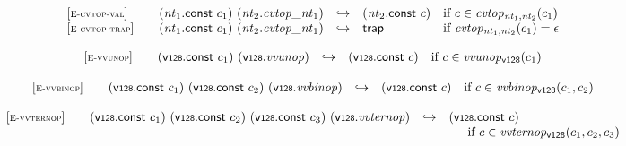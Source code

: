 \vspace{1ex}

$$
\begin{array}[t]{@{}lrcl@{}l@{}}
{[\textsc{\scriptsize E{-}cvtop{-}val}]} \quad & ({\mathit{nt}}_1{.}\mathsf{const}~c_1)~({\mathit{nt}}_2 {.} {{\mathit{cvtop}}}{\mathsf{\_}}{{\mathit{nt}}_1}) & \hookrightarrow & ({\mathit{nt}}_2{.}\mathsf{const}~c) & \quad \mbox{if}~ c \in {{\mathit{cvtop}}}{{}_{{\mathit{nt}}_1, {\mathit{nt}}_2}(c_1)} \\
{[\textsc{\scriptsize E{-}cvtop{-}trap}]} \quad & ({\mathit{nt}}_1{.}\mathsf{const}~c_1)~({\mathit{nt}}_2 {.} {{\mathit{cvtop}}}{\mathsf{\_}}{{\mathit{nt}}_1}) & \hookrightarrow & \mathsf{trap} & \quad \mbox{if}~ {{\mathit{cvtop}}}{{}_{{\mathit{nt}}_1, {\mathit{nt}}_2}(c_1)} = \epsilon \\
\end{array}
$$

\vspace{1ex}

$$
\begin{array}[t]{@{}lrcl@{}l@{}}
{[\textsc{\scriptsize E{-}vvunop}]} \quad & (\mathsf{v{\scriptstyle 128}}{.}\mathsf{const}~c_1)~(\mathsf{v{\scriptstyle 128}} {.} {\mathit{vvunop}}) & \hookrightarrow & (\mathsf{v{\scriptstyle 128}}{.}\mathsf{const}~c) & \quad \mbox{if}~ c \in {{\mathit{vvunop}}}{{}_{\mathsf{v{\scriptstyle 128}}}(c_1)} \\
\end{array}
$$

\vspace{1ex}

$$
\begin{array}[t]{@{}lrcl@{}l@{}}
{[\textsc{\scriptsize E{-}vvbinop}]} \quad & (\mathsf{v{\scriptstyle 128}}{.}\mathsf{const}~c_1)~(\mathsf{v{\scriptstyle 128}}{.}\mathsf{const}~c_2)~(\mathsf{v{\scriptstyle 128}} {.} {\mathit{vvbinop}}) & \hookrightarrow & (\mathsf{v{\scriptstyle 128}}{.}\mathsf{const}~c) & \quad \mbox{if}~ c \in {{\mathit{vvbinop}}}{{}_{\mathsf{v{\scriptstyle 128}}}(c_1, c_2)} \\
\end{array}
$$

\vspace{1ex}

$$
\begin{array}[t]{@{}lrcl@{}l@{}}
{[\textsc{\scriptsize E{-}vvternop}]} \quad & (\mathsf{v{\scriptstyle 128}}{.}\mathsf{const}~c_1)~(\mathsf{v{\scriptstyle 128}}{.}\mathsf{const}~c_2)~(\mathsf{v{\scriptstyle 128}}{.}\mathsf{const}~c_3)~(\mathsf{v{\scriptstyle 128}} {.} {\mathit{vvternop}}) & \hookrightarrow & (\mathsf{v{\scriptstyle 128}}{.}\mathsf{const}~c) &  \\
&&& \multicolumn{2}{@{}l@{}}{\quad
\quad \mbox{if}~ c \in {{\mathit{vvternop}}}{{}_{\mathsf{v{\scriptstyle 128}}}(c_1, c_2, c_3)}
} \\
\end{array}
$$

